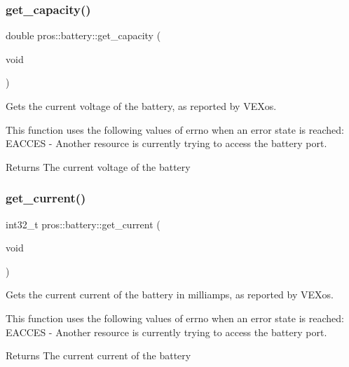 \subsubsection{\texorpdfstring{get\_capacity()}{get\_capacity()}}
{\footnotesize\ttfamily double pros\+::battery\+::get\+\_\+capacity (\begin{DoxyParamCaption}\item[{void}]{ }\end{DoxyParamCaption})}



Gets the current voltage of the battery, as reported by V\+E\+Xos. 

This function uses the following values of errno when an error state is reached\+: E\+A\+C\+C\+ES -\/ Another resource is currently trying to access the battery port.

\begin{DoxyReturn}{Returns}
The current voltage of the battery 
\end{DoxyReturn}
\mbox{\label{namespacepros_1_1battery_ad0f092e6341126d68ae15d41b5dba352}} 
\subsubsection{\texorpdfstring{get\_current()}{get\_current()}}
{\footnotesize\ttfamily int32\+\_\+t pros\+::battery\+::get\+\_\+current (\begin{DoxyParamCaption}\item[{void}]{ }\end{DoxyParamCaption})}



Gets the current current of the battery in milliamps, as reported by V\+E\+Xos. 

This function uses the following values of errno when an error state is reached\+: E\+A\+C\+C\+ES -\/ Another resource is currently trying to access the battery port.

\begin{DoxyReturn}{Returns}
The current current of the battery 
\end{DoxyReturn}
\mbox{\label{namespacepros_1_1battery_a33d1a503808ed06148a1884e3ccf88ae}} 

